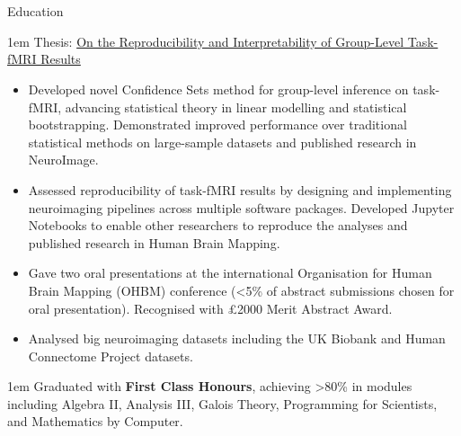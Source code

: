 \documentclass{my_cv}
\begin{document}
\section{\faGraduationCap}{Education}
%
{\begin{addmargin}[2em]{1em}
    Thesis: \href{https://doi.org/10.31237/osf.io/mj7qa}{On the Reproducibility and Interpretability of Group-Level Task-fMRI Results} 
    \begin{itemize}[topsep=0pt,itemsep=0pt,partopsep=0pt, parsep=0pt] 
        \item Developed novel Confidence Sets method for group-level inference on task-fMRI, advancing statistical theory in linear modelling and statistical bootstrapping. Demonstrated improved performance over traditional statistical methods on large-sample datasets and published research in NeuroImage.
        \item Assessed reproducibility of task-fMRI results by designing and implementing neuroimaging pipelines across multiple software packages. Developed Jupyter Notebooks to enable other researchers to reproduce the analyses and  published research in Human Brain Mapping. 
        \item  Gave two oral presentations at the international Organisation for Human Brain Mapping (OHBM) conference (<5\% of abstract submissions chosen for oral presentation). Recognised with £2000 Merit Abstract Award.
        \item Analysed big neuroimaging datasets including the UK Biobank and Human Connectome Project datasets.
    \end{itemize}
\end{addmargin}}
%
{\begin{addmargin}[2em]{1em}
    Graduated with \textbf{First Class Honours}, achieving >80\% in modules including Algebra II, Analysis III, Galois Theory, Programming for Scientists, and Mathematics by Computer.
\end{addmargin}}
\end{document}
